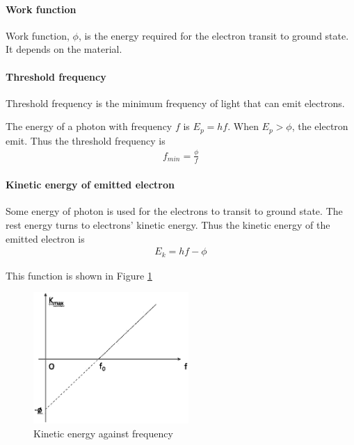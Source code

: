         \paragraph{Work function}
            Work function, $\phi$, is the energy required for the electron transit to ground state. It depends on the material. 

        \paragraph{Threshold frequency}
            Threshold frequency is the minimum frequency of light that can emit electrons.

            The energy of a photon with frequency $f$ is $E_p = hf$. When $E_p > \phi$, the electron emit. Thus the threshold frequency is
            \begin{align}
                f_{min} = \frac{\phi}{f}
            \end{align}

        \paragraph{Kinetic energy of emitted electron}
            Some energy of photon is used for the electrons to transit to ground state. The rest energy turns to electrons' kinetic energy. Thus the kinetic energy of the emitted electron is
            \begin{align}
                E_k = hf - \phi
            \end{align}

            This function is shown in Figure \ref{thres_freq_func}

            \begin{figure}[H]
                \begin{center}
                    \includegraphics[height=5cm]{quantum_charts/thres_freq_func.eps}
                \end{center}
                \caption{Kinetic energy against frequency}
                \label{thres_freq_func}
            \end{figure}

